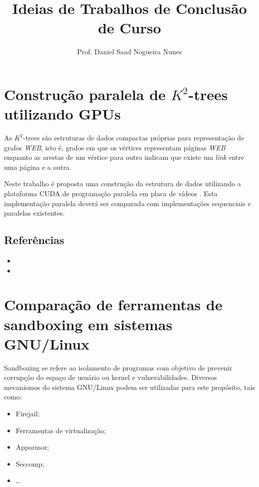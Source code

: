 \documentclass{article}
\author{Prof. Daniel Saad Nogueira Nunes}
\title{Ideias de Trabalhos de Conclusão de Curso}
\date{}
\begin{document}
\maketitle
{}



\section*{Construção paralela de $K^2$-trees utilizando GPUs}

As $K^2$-trees são estruturas de dados compactas próprias para representação de grafos \textit{WEB}, isto é, grafos em que os vértices representam páginas \textit{WEB} enquanto as arestas de um vértice para outro indicam que existe um \textit{link} entre uma página e a outra.

Neste trabalho é proposta uma construção da estrutura de dados utilizando a plataforma CUDA de programação paralela em placa de vídeos . Esta implementação paralela deverá ser comparada com implementações sequenciais e paralelas existentes.

\subsection*{Referências}

\begin{itemize}
	\item {}
	\item {}
\end{itemize}

\section*{Comparação de ferramentas de sandboxing em sistemas GNU/Linux}

Sandboxing se refere ao isolamento de programas com objetivo de prevenir corrupção do espaço de usuário ou kernel e vulnerabilidades. Diversos mecanismos do sistema GNU/Linux podem ser utilizadas para este propósito, tais como: 
\begin{itemize}
	\item Firejail;
	\item Ferramentas de virtualização;
	\item Apparmor;
	\item Seccomp;
	\item \ldots
\end{itemize}
\end{document}
